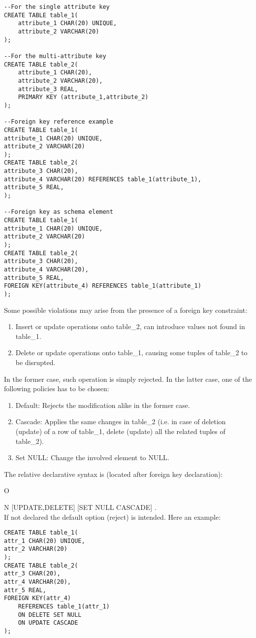 \documentclass[a4page, 11pt]{article}
\theoremstyle{definition}
\begin{document}
\begin{lstlisting}
--For the single attribute key
CREATE TABLE table_1(
	attribute_1 CHAR(20) UNIQUE,
	attribute_2 VARCHAR(20)
);

--For the multi-attribute key
CREATE TABLE table_2(
	attribute_1 CHAR(20),
	attribute_2 VARCHAR(20),
	attribute_3 REAL,
	PRIMARY KEY (attribute_1,attribute_2)
);

--Foreign key reference example
CREATE TABLE table_1(
attribute_1 CHAR(20) UNIQUE,
attribute_2 VARCHAR(20)
);
CREATE TABLE table_2(
attribute_3 CHAR(20),
attribute_4 VARCHAR(20) REFERENCES table_1(attribute_1),
attribute_5 REAL,
);

--Foreign key as schema element
CREATE TABLE table_1(
attribute_1 CHAR(20) UNIQUE,
attribute_2 VARCHAR(20)
);
CREATE TABLE table_2(
attribute_3 CHAR(20),
attribute_4 VARCHAR(20),
attribute_5 REAL,
FOREIGN KEY(attribute_4) REFERENCES table_1(attribute_1)
);
\end{lstlisting}

Some possible violations may arise from the presence of a foreign key constraint:
\begin{enumerate}[noitemsep]
	\item Insert or update operations onto table\_2, can introduce values not found in table\_1.
	\item Delete or update operations onto table\_1, causing some tuples of table\_2 to be disrupted.
\end{enumerate}
In the former case, such operation is simply rejected. In the latter case, one of the following policies has to be chosen:
\begin{enumerate}[noitemsep]
	\item Default: Rejects the modification alike in the former case.
	\item Cascade: Applies the same changes in table\_2 (i.e. in case of deletion (update) of a row of table\_1, delete (update) all the related tuples of table\_2).
	\item Set NULL: Change the involved element to NULL.
\end{enumerate}
The relative declarative syntax is (located after foreign key declaration): 
\centerline ON [UPDATE,DELETE] [SET NULL CASCADE] . \\
 If not declared the default option (reject) is intended. Here an example:
\begin{lstlisting}
CREATE TABLE table_1(
attr_1 CHAR(20) UNIQUE,
attr_2 VARCHAR(20)
);
CREATE TABLE table_2(
attr_3 CHAR(20),
attr_4 VARCHAR(20),
attr_5 REAL,
FOREIGN KEY(attr_4)
	REFERENCES table_1(attr_1)
	ON DELETE SET NULL
	ON UPDATE CASCADE
);
\end{lstlisting}
\end{document}
